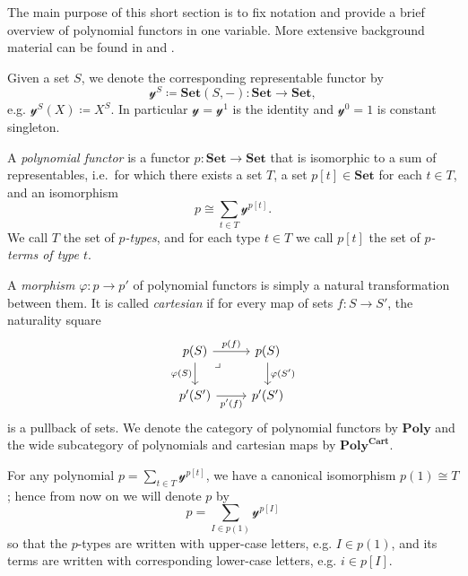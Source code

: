 \documentclass[11pt, one side, article]{memoir}
\theoremstyle{definition}
\theoremstyle{plain}
\newenvironment{definition}
  {\pushQED{\qed}\renewcommand{\qedsymbol}{$\lozenge$}\definitionx}
  {\popQED\enddefinitionx}
\newcommand{\Cat}[1]{\mathbf{#1}}%
\newcommand{\smset}{\Cat{Set}}
\newcommand{\yon}{\mathcal{y}}
\newcommand{\poly}{\Cat{Poly}}
\newcommand{\polycart}{\poly^{\Cat{Cart}}}
\newcommand{\0}{\textsf{0}}
\newcommand{\1}{\tn{\textsf{1}}}
\begin{document}
The main purpose of this short section is to fix notation and provide a brief overview of polynomial functors in one variable. More extensive background material can be found in \cite{spivak2022poly} and \cite{kock2012polynomial}. 

\begin{definition}[Polynomial functor]\label{def.poly}
Given a set $S$, we denote the corresponding representable functor by
\[\yon^S\coloneqq\smset(S,-)\colon\smset\to\smset,\]
e.g. $\yon^S(X)\coloneqq X^S$. In particular $\yon=\yon^1$ is the identity and $\yon^0=1$ is constant singleton.

A \emph{polynomial functor} is a functor $p\colon\smset\to\smset$ that is isomorphic to a sum of representables, i.e.\ for which there exists a set $T$, a set $p[t]\in\smset$ for each $t\in T$, and an isomorphism
\[
p\cong\sum_{t\in T}\yon^{p[t]}.
\]
We call $T$ the set of \emph{$p$-types}, and for each type $t\in T$ we call $p[t]$ the set of \emph{$p$-terms of type $t$}.%

A \emph{morphism} $\varphi\colon p\to p'$ of polynomial functors is simply a natural transformation between them. It is called \emph{cartesian} if for every map of sets $f\colon S\to S'$, the naturality square
\[
\begin{tikzcd}
  p(S)\ar[r, "p(f)"]\ar[d, "\varphi(S)"']&p(S)\ar[d, "\varphi(S')"]\\
  p'(S')\ar[r, "p'(f)"']&p'(S')\ar[ul, phantom, very near end, "\lrcorner"]
\end{tikzcd}
\]
is a pullback of sets. We denote the category of polynomial functors by $\poly$ and the wide subcategory of polynomials and cartesian maps by $\polycart$.\end{definition}

For any polynomial $p=\sum_{t\in T}\yon^{p[t]}$, we have a canonical isomorphism $p(1)\cong T$; hence from now on we will denote $p$ by
\begin{equation}\label{eqn.poly_notation}
p=\sum_{I\in p(1)}\yon^{p[I]}
\end{equation}
so that the $p$-types are written with upper-case letters, e.g. $I\in p(1)$, and its terms are written with corresponding lower-case letters, e.g. $i\in p[I]$.
\end{document}
